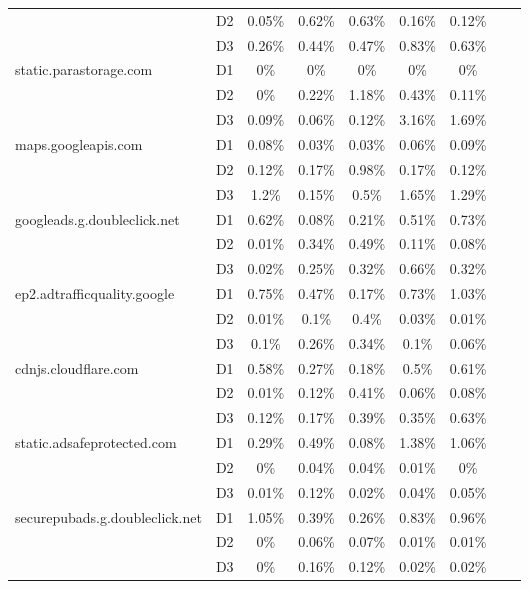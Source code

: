 \begin{table}[!ht]
\begin{tabular}{l|c|c|c|c|c|c|c|c}
        ~ & D2 & 0.05\% & 0.62\% & 0.63\% & 0.16\% & 0.12\% \\
        ~ & D3 & 0.26\% & 0.44\% & 0.47\% & 0.83\% & 0.63\% \\ \hline
        \multirow{3}{*}{static.parastorage.com} & D1 & 0\% & 0\% & 0\% & 0\% & 0\% \\
        ~ & D2 & 0\% & 0.22\% & 1.18\% & 0.43\% & 0.11\% \\
        ~ & D3 & 0.09\% & 0.06\% & 0.12\% & 3.16\% & 1.69\% \\ \hline
        \multirow{3}{*}{maps.googleapis.com} & D1 & 0.08\% & 0.03\% & 0.03\% & 0.06\% & 0.09\% \\
        ~ & D2 & 0.12\% & 0.17\% & 0.98\% & 0.17\% & 0.12\% \\
        ~ & D3 & 1.2\% & 0.15\% & 0.5\% & 1.65\% & 1.29\% \\ \hline
        \multirow{3}{*}{googleads.g.doubleclick.net} & D1 & 0.62\% & 0.08\% & 0.21\% & 0.51\% & 0.73\% \\
        ~ & D2 & 0.01\% & 0.34\% & 0.49\% & 0.11\% & 0.08\% \\
        ~ & D3 & 0.02\% & 0.25\% & 0.32\% & 0.66\% & 0.32\% \\ \hline
        \multirow{3}{*}{ep2.adtrafficquality.google} & D1 & 0.75\% & 0.47\% & 0.17\% & 0.73\% & 1.03\% \\
        ~ & D2 & 0.01\% & 0.1\% & 0.4\% & 0.03\% & 0.01\% \\
        ~ & D3 & 0.1\% & 0.26\% & 0.34\% & 0.1\% & 0.06\% \\ \hline
        \multirow{3}{*}{cdnjs.cloudflare.com} & D1 & 0.58\% & 0.27\% & 0.18\% & 0.5\% & 0.61\% \\
        ~ & D2 & 0.01\% & 0.12\% & 0.41\% & 0.06\% & 0.08\% \\
        ~ & D3 & 0.12\% & 0.17\% & 0.39\% & 0.35\% & 0.63\% \\ \hline
        \multirow{3}{*}{static.adsafeprotected.com} & D1 & 0.29\% & 0.49\% & 0.08\% & 1.38\% & 1.06\% \\
        ~ & D2 & 0\% & 0.04\% & 0.04\% & 0.01\% & 0\% \\
        ~ & D3 & 0.01\% & 0.12\% & 0.02\% & 0.04\% & 0.05\% \\ \hline
        \multirow{3}{*}{securepubads.g.doubleclick.net} & D1 & 1.05\% & 0.39\% & 0.26\% & 0.83\% & 0.96\% \\
        ~ & D2 & 0\% & 0.06\% & 0.07\% & 0.01\% & 0.01\% \\
        ~ & D3 & 0\% & 0.16\% & 0.12\% & 0.02\% & 0.02\% \\ \hline

\end{tabular}
\end{table}
